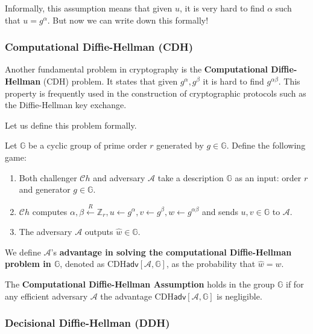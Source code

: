 \documentclass[../lecture-notes.tex]{subfiles}
\begin{document}
Informally, this assumption means that given $u$, it is very hard to find $\alpha$ such that $u = g^{\alpha}$. But now we can write down this formally!

\subsubsection{Computational Diffie-Hellman (CDH)}

Another fundamental problem in cryptography is the \textbf{Computational Diffie-Hellman} (CDH) problem. It states that given $g^{\alpha},g^{\beta}$ it is hard to find $g^{\alpha\beta}$. This property is frequently used in the construction of cryptographic protocols such as the Diffie-Hellman key exchange.

Let us define this problem formally.

\begin{definition}
    Let $\mathbb{G}$ be a cyclic group of prime order $r$ generated by $g \in \mathbb{G}$. Define the following game:
    \begin{enumerate}
        \item Both challenger $\mathcal{C}h$ and adversary $\mathcal{A}$ take a description $\mathbb{G}$ as an input: order $r$ and generator $g \in \mathbb{G}$.
        \item $\mathcal{C}h$ computes $\alpha, \beta \xleftarrow{R} \mathbb{Z}_r, u \gets g^{\alpha}, v \gets g^{\beta}, w \gets g^{\alpha\beta}$ and sends $u,v \in \mathbb{G}$ to $\mathcal{A}$.
        \item The adversary $\mathcal{A}$ outputs $\hat{w} \in \mathbb{G}$.
    \end{enumerate}

    We define $\mathcal{A}$'s \textbf{advantage in solving the computational Diffie-Hellman problem in $\mathbb{G}$}, denoted as $\text{CDH}\mathsf{adv}[\mathcal{A},\mathbb{G}]$, as the probability that $\hat{w} = w$.
\end{definition}

\begin{definition}
    The \textbf{Computational Diffie-Hellman Assumption} holds in the group $\mathbb{G}$ if for any efficient adversary $\mathcal{A}$ the advantage $\text{CDH}\mathsf{adv}[\mathcal{A},\mathbb{G}]$ is negligible.
\end{definition}

\subsubsection{Decisional Diffie-Hellman (DDH)}
\end{document}
